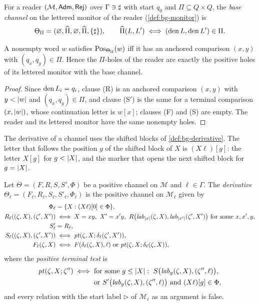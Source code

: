 For a reader $(\mathcal M,\mathsf{Adm},\mathsf{Rej})$ over $\Gamma\ni\sharp$ with start $q_0$ and
$\Pi\subseteq Q\times Q$, the \emph{base channel} on the lettered monitor of
the reader (\cref{def:bg-monitor}) is
\[
 \Theta_\Pi=(\varnothing,\widehat\Pi,\varnothing,\widehat\Pi,\{\sharp\}),
 \qquad
 \widehat\Pi(L,L')\iff(\operatorname{den} L,\operatorname{den} L')\in\Pi .
\]

\begin{lemma}\label{lem:mo-base}
A nonempty word $w$ satisfies $\operatorname{Pos}_{\Theta_\Pi}(w)$ iff it has an anchored
comparison $(x,y)$ with $(q_x,q_y)\in\Pi$. Hence the $\Pi$-holes of the reader
are exactly the positive holes of its lettered monitor with the base channel.
\end{lemma}

\begin{proof}
Since $\operatorname{den} L_i=q_i$, clause (R) is an anchored comparison $(x,y)$ with
$y<\lvert w\rvert$ and $(q_x,q_y)\in\Pi$, and clause (S$'$) is the same for a terminal
comparison $(x,\lvert w\rvert)$, whose continuation letter is $w[x]$; clauses (F) and
(S) are empty. The reader and its lettered monitor have the same nonempty
holes.
\end{proof}

The derivative of a channel uses the shifted blocks of
\cref{def:bg-derivative}. The letter that follows the position $g$ of the
shifted block of $X$ is $(X\ell)[g]$: the letter $X[g]$ for $g<\lvert X\rvert$, and
the marker that opens the next shifted block for $g=\lvert X\rvert$.

\begin{definition}\label{def:mo-channel-derivative}
Let $\Theta=(F,R,S,S',\Phi)$ be a positive channel on $\mathcal M$ and
$\ell\in\Gamma$. The \emph{derivative} $\Theta_\ell=(F_\ell,R_\ell,S_\ell,
S'_\ell,\Phi_\ell)$ is the positive channel on $\mathcal M_\ell$ given by
\[
\begin{aligned}
 \Phi_\ell&=\{X:(X\ell)[0]\in\Phi\},\\
 R_\ell((\zeta,X),(\zeta',X'))&\iff X=xy,\ X'=x'y,\
   R\bigl(\mathit{lab}_{\lvert x\rvert}(\zeta,X),\mathit{lab}_{\lvert x'\rvert}(\zeta',X')\bigr)
   \text{ for some }x,x',y,\\
 S'_\ell&=R_\ell,\\
 S_\ell((\zeta,X),(\zeta',X'))&\iff\mathit{pt}(\zeta,X;\delta_\ell(\zeta',X')),\\
 F_\ell(\zeta,X)&\iff F(\delta_\ell(\zeta,X),\ell)\ \text{or}\
   \mathit{pt}(\zeta,X;\delta_\ell(\zeta,X)),
\end{aligned}
\]
where the \emph{positive terminal test} is
\[
\begin{aligned}
 \mathit{pt}(\zeta,X;\zeta'')\iff{}&\text{for some }g\le\lvert X\rvert:\
 S\bigl(\mathit{lab}_g(\zeta,X),(\zeta'',\ell)\bigr),\\
 &\text{or }S'\bigl(\mathit{lab}_g(\zeta,X),(\zeta'',\ell)\bigr)\text{ and }
 (X\ell)[g]\in\Phi,
\end{aligned}
\]
and every relation with the start label $\triangleright$ of $\mathcal M_\ell$ as
an argument is false.
\end{definition}

